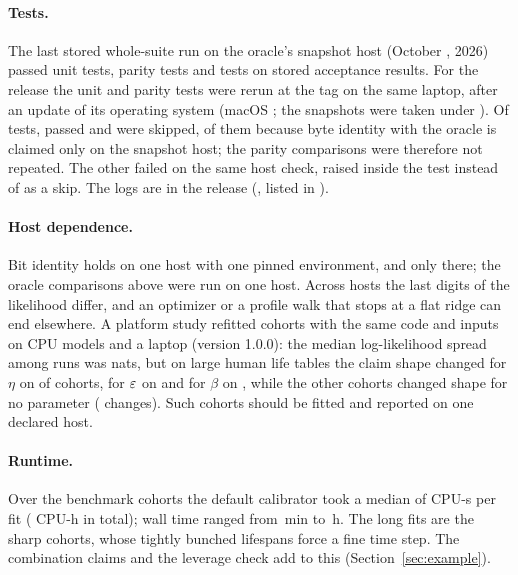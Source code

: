 \paragraph{Tests.} The last stored whole-suite run on the oracle's snapshot host (October , 2026)
passed  unit tests,  parity tests and  tests on stored
acceptance results. For the release the unit and parity tests were rerun at the tag on the same laptop, after an update
of its operating system (macOS ; the snapshots were taken under ). Of 
tests,  passed and  were skipped,  of them because byte identity with
the oracle is claimed only on the snapshot host; the parity comparisons were therefore not repeated. The other
 failed on the same host check, raised inside the test instead of as a skip. The logs are in the
release (, listed in ).

\paragraph{Host dependence.} Bit identity holds on one host with one pinned environment, and only there; the
oracle comparisons above were run on one host. Across hosts the last digits of the likelihood differ, and an optimizer or
a profile walk that stops at a flat ridge can end elsewhere. A platform study refitted  cohorts with the
same code and inputs on  CPU models and a laptop (version 1.0.0): the median log-likelihood spread among
runs was  nats, but on large human life tables the claim shape changed for $\eta$ on  of
 cohorts, for $\varepsilon$ on  and for $\beta$ on , while the other
 cohorts changed shape for no parameter ( changes). Such cohorts should be fitted and reported on one declared
host.

\paragraph{Runtime.} Over the  benchmark cohorts the default calibrator took a median of
 CPU-s per fit ( CPU-h in total); wall time ranged from \,min to
\,h. The long fits are the sharp cohorts, whose tightly bunched lifespans force a fine time step. The combination
claims and the leverage check add to this (Section~\ref{sec:example}).
